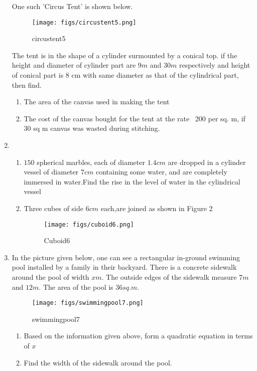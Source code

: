 \documentclass{article}
\begin{document}
\begin{enumerate}
One such 'Circus Tent' is shown below.
 \begin{figure}[H]
 \centering
 \texttt{[image: figs/circustent5.png]}
 \caption{circustent5}
 \label{fig:circustent5}
 \end{figure}
  The tent is in the shape of a cylinder surmounted by a conical top. if the height and diameter of cylinder part are $9 m$ and $30 m$ respectively and height of conical part is 8 cm with same diameter as that of the cylindrical part, then find.
    \begin{enumerate}
    \item  The area of the canvas used in making the tent
    \item  The cost of the canvas bought for the tent at the rate \rupee~200 per sq. m, if 30 sq m canvas was wasted during stitching.
    \end{enumerate}
\newpage
\item 
\begin{enumerate}
   \item $150$ spherical marbles, each of diameter $1.4 cm$ are dropped in a cylinder vessel of diameter $7cm$ containing some water, and are completely immersed in water.Find the rise in the level of water in the cylindrical vessel

\item Three cubes of side $6cm$ each,are joined as shown in Figure 2
\begin{figure}[H]
\centering
\texttt{[image: figs/cuboid6.png]}
\caption{Cuboid6}
\label{fig:cuboid6}
\end{figure}
\end{enumerate}

\item In the picture given below, one can see a rectangular in-ground swimming pool installed by a family in their backyard. There is a concrete sidewalk around the pool of width $x m$. The outside edges of the sidewalk measure $7 m$ and $12 m$. The area of the pool is $36 sq. m$.
\begin{figure}[H]
    \centering
    \texttt{[image: figs/swimmingpool7.png]}
    \caption{swimmingpool7}
    \label{fig:swimmingpool7}
\end{figure}
\begin{enumerate}
    \item Based on the information given above, form a quadratic equation in terms of $x$
    \item Find the width of the sidewalk around the pool.
\end{enumerate}


\end{enumerate}
\end{document}
